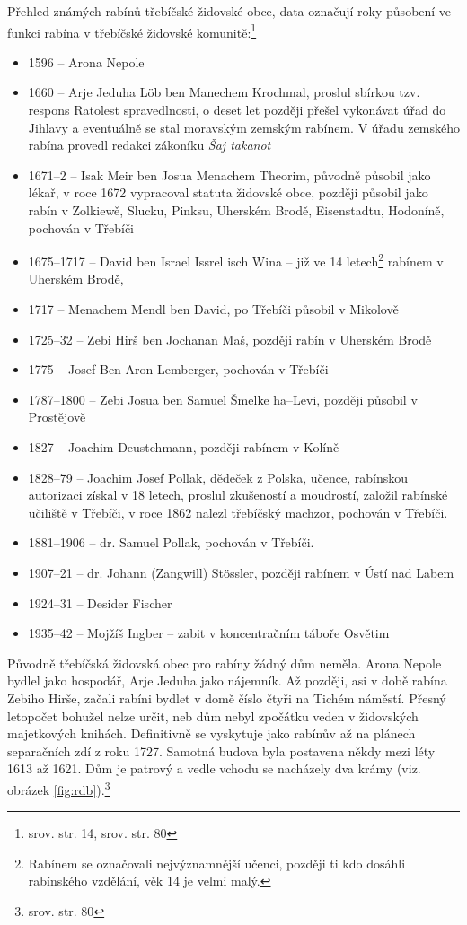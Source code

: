 \documentclass[a4paper,oneside,12pt]{report}
\begin{document}
\vspace{0.25cm}
\noindent
Přehled známých rabínů třebíčské židovské obce, data označují roky působení ve funkci rabína v třebíčské židovské komunitě:\footnote{srov. \cite{Klenovsky2003} str. 14, srov. \cite{Fiser2005} str. 80}
\begin{itemize}
	\item 1596 -- Arona Nepole
	\item 1660 -- Arje Jeduha Löb ben Manechem Krochmal, proslul sbírkou tzv. respons Ratolest spravedlnosti, o deset let později přešel vykonávat úřad do Jihlavy a eventuálně se stal moravským zemským rabínem. V úřadu zemského rabína provedl redakci zákoníku \textit{Šaj takanot}
	\item 1671--2 -- Isak Meir ben Josua Menachem Theorim, původně působil jako lékař, v roce 1672 vypracoval statuta židovské obce, později působil jako rabín v Zolkiewě, Slucku, Pinksu, Uherském Brodě, Eisenstadtu, Hodoníně, pochován v Třebíči
	\item 1675--1717 -- David ben Israel Issrel isch Wina -- již ve 14 letech\footnote{Rabínem se označovali nejvýznamnější učenci, později ti kdo dosáhli rabínského vzdělání, věk 14 je velmi malý.} rabínem v Uherském Brodě,
	\item 1717 -- Menachem Mendl ben David, po Třebíči působil v Mikolově
	\item 1725--32 -- Zebi Hirš ben Jochanan Maš, později rabín v Uherském Brodě
	\item 1775 -- Josef Ben Aron Lemberger, pochován v Třebíči
	\item 1787--1800 -- Zebi Josua ben Samuel Šmelke ha--Levi, později působil v Prostějově
	\item 1827 -- Joachim Deustchmann, později rabínem v Kolíně
	\item 1828--79 -- Joachim Josef Pollak, dědeček z Polska, učence, rabínskou autorizaci získal v 18 letech, proslul zkušeností a moudrostí, založil rabínské učiliště v Třebíči, v roce 1862 nalezl třebíčský machzor, pochován v Třebíči.
	\item 1881--1906 -- dr. Samuel Pollak, pochován v Třebíči.
	\item 1907--21 -- dr. Johann (Zangwill) Stössler, později rabínem v Ústí nad Labem
	\item 1924--31 -- Desider Fischer
	\item 1935--42 -- Mojžíš Ingber -- zabit v koncentračním táboře Osvětim
\end{itemize}

Původně třebíčská židovská obec pro rabíny žádný dům neměla.
Arona Nepole bydlel jako hospodář, Arje Jeduha jako nájemník.
Až později, asi v době rabína Zebiho Hirše, začali rabíni bydlet v domě číslo čtyři na Tichém náměstí.
Přesný letopočet bohužel nelze určit, neb dům nebyl zpočátku veden v židovských majetkových knihách.
Definitivně se vyskytuje jako rabínův až na plánech separačních zdí z roku 1727.
Samotná budova byla postavena někdy mezi léty 1613 až 1621.
Dům je patrový a vedle vchodu se nacházely dva krámy (viz. obrázek \ref{fig:rdb}).\footnote{srov. \cite{Fiser2005} str. 80}
\end{document}
